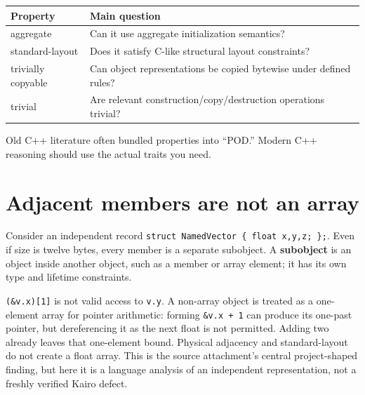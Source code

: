 {\def\LTcaptype{none} %
\begin{longtable}[]{@{}
  >{\raggedright\arraybackslash}p{}
  >{\raggedright\arraybackslash}p{}@{}}
\toprule\noalign{}
\begin{minipage}[b]{\linewidth}\raggedright
Property
\end{minipage} & \begin{minipage}[b]{\linewidth}\raggedright
Main question
\end{minipage} \\
\midrule\noalign{}
\endhead
\bottomrule\noalign{}
\endlastfoot
aggregate & Can it use aggregate initialization semantics? \\
standard-layout & Does it satisfy C-like structural layout constraints? \\
trivially copyable & Can object representations be copied bytewise under defined rules? \\
trivial & Are relevant construction/copy/destruction operations trivial? \\
\end{longtable}
}

Old C++ literature often bundled properties into ``POD.'' Modern C++ reasoning should use the actual traits you need.

\section{Adjacent members are not an array}\label{05-engine-i-ch003-adjacent-members-are-not-an-array}

Consider an independent record \texttt{struct\ NamedVector\ \{\ float\ x,y,z;\ \};}. Even if size is twelve bytes, every member is a separate subobject. A \textbf{subobject} is an object inside another object, such as a member or array element; it has its own type and lifetime constraints.

\texttt{(\&v.x){[}1{]}} is not valid access to \texttt{v.y}. A non-array object is treated as a one-element array for pointer arithmetic: forming \texttt{\&v.x\ +\ 1} can produce its one-past pointer, but dereferencing it as the next float is not permitted. Adding two already leaves that one-element bound. Physical adjacency and standard-layout do not create a float array. This is the source attachment's central project-shaped finding, but here it is a language analysis of an independent representation, not a freshly verified Kairo defect.

